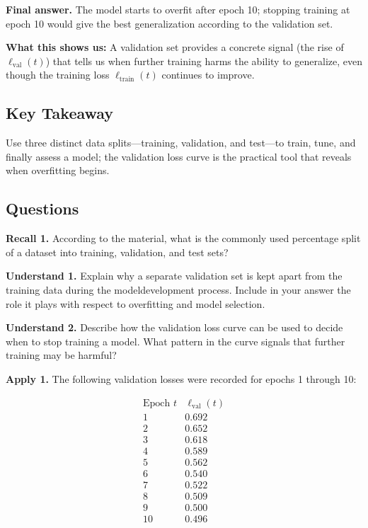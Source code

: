 \documentclass[12pt, a4paper]{article}
\begin{document}
\textbf{Final answer.}  
The model starts to overfit after epoch 10; stopping training at epoch 10 would give the best generalization according to the validation set.

\textbf{What this shows us:}  
A validation set provides a concrete signal (the rise of \(\ell_{\text{val}}(t)\)) that tells us when further training harms the ability to generalize, even though the training loss \(\ell_{\text{train}}(t)\) continues to improve.

\subsection{Key Takeaway}
Use three distinct data splits---training, validation, and test---to train, tune, and finally assess a model; the validation loss curve is the practical tool that reveals when overfitting begins.

\subsection{Questions}
\textbf{Recall 1.} According to the material, what is the commonly used percentage split of a dataset into training, validation, and test sets?\newpage

\textbf{Understand 1.} Explain why a separate validation set is kept apart from the training data during the modeldevelopment process. Include in your answer the role it plays with respect to overfitting and model selection.\newpage

\textbf{Understand 2.} Describe how the validation loss curve can be used to decide when to stop training a model. What pattern in the curve signals that further training may be harmful?\newpage

\textbf{Apply 1.} The following validation losses were recorded for epochs 1 through 10:

\[
\begin{array}{c|c}
\text{Epoch } t & \ell_{\text{val}}(t) \\ \hline
1 & 0.692 \\ 
2 & 0.652 \\ 
3 & 0.618 \\ 
4 & 0.589 \\ 
5 & 0.562 \\ 
6 & 0.540 \\ 
7 & 0.522 \\ 
8 & 0.509 \\ 
9 & 0.500 \\ 
10& 0.496
\end{array}
\]
\end{document}
